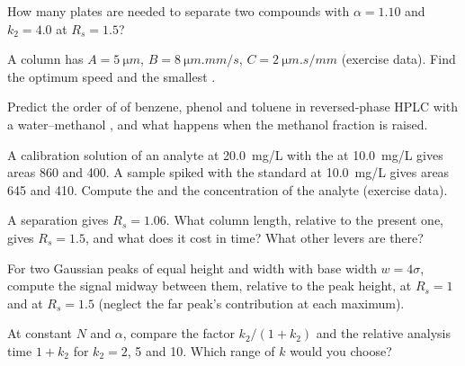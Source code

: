 \begin{exercise}[$\star\star$]\label{exo:b2:chromatography:6}
How many plates are needed to separate two compounds with $\alpha = 1.10$ and $k_2 = 4.0$ at
$R_s = 1.5$?
\end{exercise}

\begin{exercise}[$\star\star$]\label{exo:b2:chromatography:7}
A column has $A = \qty{5}{\micro m}$, $B = \qty{8}{\micro m.mm/s}$, $C = \qty{2}{\micro m.s/mm}$
(exercise data). Find the optimum speed and the smallest .
\end{exercise}

\begin{exercise}[$\star\star$]\label{exo:b2:chromatography:8}
Predict the order of  of benzene, phenol and toluene in reversed-phase HPLC with a
water--methanol , and what happens when the methanol fraction is raised.
\end{exercise}

\begin{exercise}[$\star\star$]\label{exo:b2:chromatography:9}
A calibration solution of an analyte at \qty{20.0}{mg/L} with the  at \qty{10.0}{mg/L}
gives areas 860 and 400. A sample spiked with the standard at \qty{10.0}{mg/L} gives areas 645 and 410.
Compute the  and the concentration of the analyte (exercise data).
\end{exercise}

\begin{exercise}[$\star\star\star$]\label{exo:b2:chromatography:10}
A separation gives $R_s = 1.06$. What column length, relative to the present one, gives $R_s = 1.5$, and
what does it cost in time? What other levers are there?
\end{exercise}

\begin{exercise}[$\star\star\star$]\label{exo:b2:chromatography:11}
For two Gaussian peaks of equal height and width with base width $w = 4\sigma$, compute the signal
midway between them, relative to the peak height, at $R_s = 1$ and at $R_s = 1.5$ (neglect the far
peak's contribution at each maximum).
\end{exercise}

\begin{exercise}[$\star\star\star$]\label{exo:b2:chromatography:12}
At constant $N$ and $\alpha$, compare the  factor $k_2/(1+k_2)$ and the relative analysis time
$1 + k_2$ for $k_2 = 2$, 5 and 10. Which range of $k$ would you choose?
\end{exercise}

